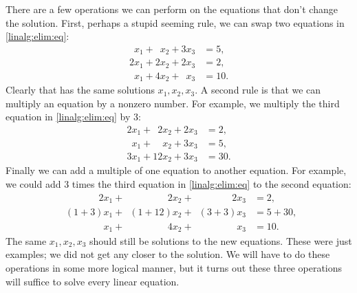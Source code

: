 There are a few operations we can perform on the equations that don't change
the solution.  First, perhaps a stupid seeming rule, we can swap 
two equations in \eqref{linalg:elim:eq}:
\begin{equation*}
\begin{aligned}
\phantom{9} x_1 + \phantom{9} x_2 +           3 x_3 & = 5 , \\
          2 x_1 +           2 x_2 +           2 x_3 & = 2 , \\
\phantom{9} x_1 +           4 x_2 + \phantom{9} x_3 & = 10 .
\end{aligned}
\end{equation*}
Clearly that has the same solutions $x_1,x_2,x_3$.
A second rule is that we can multiply an equation by a nonzero number.  For
example, we multiply the third equation in \eqref{linalg:elim:eq}
by 3:
\begin{equation*}
\begin{aligned}
          2 x_1 + \phantom{9}  2 x_2 + 2 x_3 & = 2 , \\
\phantom{9} x_1 + \phantom{99}   x_2 + 3 x_3 & = 5 , \\
          3 x_1 +             12 x_2 + 3 x_3 & = 30 .
\end{aligned}
\end{equation*}
Finally we can add a multiple of one equation to another equation.
For example, we could add 3 times the third equation in \eqref{linalg:elim:eq}
to the second equation:
\begin{equation*}
\begin{aligned}
\phantom{(1+3)} 2 x_1 + \phantom{(1+12)}  2 x_2 + \phantom{(3+3)} 2 x_3 & = 2 , \\
\phantom{2} (1+3) x_1 + \phantom{2}(1+12)   x_2 + \phantom{2} (3+3) x_3 & = 5+30 , \\
\phantom{2 (1+3)} x_1 + \phantom{(1+12)}  4 x_2 + \phantom{(3+3) 2} x_3 & = 10 .
\end{aligned}
\end{equation*}
The same $x_1,x_2,x_3$ should still be solutions
to the new equations.
These were just examples; we did not get any closer to the solution.  We will
have to do these operations in some more logical manner, but it turns out
these three operations will suffice to solve every linear equation.

